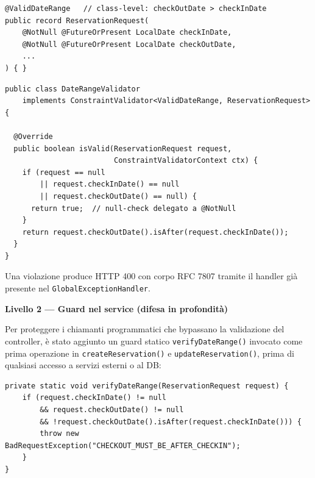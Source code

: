 ﻿\documentclass[a4paper,12pt]{report}
\begin{document}
\begin{securebox}[title={Codice Sicuro --- ReservationRequest.java (dopo)}]
\begin{lstlisting}[style=java]
@ValidDateRange   // class-level: checkOutDate > checkInDate
public record ReservationRequest(
    @NotNull @FutureOrPresent LocalDate checkInDate,
    @NotNull @FutureOrPresent LocalDate checkOutDate,
    ...
) { }
\end{lstlisting}
\end{securebox}

\begin{securebox}[title={Codice Sicuro --- DateRangeValidator.java}]
\begin{lstlisting}[style=java]
public class DateRangeValidator
    implements ConstraintValidator<ValidDateRange, ReservationRequest> {

  @Override
  public boolean isValid(ReservationRequest request,
                         ConstraintValidatorContext ctx) {
    if (request == null
        || request.checkInDate() == null
        || request.checkOutDate() == null) {
      return true;  // null-check delegato a @NotNull
    }
    return request.checkOutDate().isAfter(request.checkInDate());
  }
}
\end{lstlisting}
\end{securebox}

Una violazione produce HTTP 400 con corpo RFC 7807 tramite il
\texttt{} handler già presente nel
\texttt{GlobalExceptionHandler}.

\textbf{Livello 2 --- Guard nel service (difesa in profondità)}

Per proteggere i chiamanti programmatici che bypassano la validazione del
controller, è stato aggiunto un guard statico \texttt{verifyDateRange()} invocato
come prima operazione in \texttt{createReservation()} e \texttt{updateReservation()},
prima di qualsiasi accesso a servizi esterni o al DB:

\begin{securebox}[title={Codice Sicuro --- ReservationServiceImpl.java}]
\begin{lstlisting}[style=java]
private static void verifyDateRange(ReservationRequest request) {
    if (request.checkInDate() != null
        && request.checkOutDate() != null
        && !request.checkOutDate().isAfter(request.checkInDate())) {
        throw new BadRequestException("CHECKOUT_MUST_BE_AFTER_CHECKIN");
    }
}
\end{lstlisting}
\end{securebox}
\end{document}

